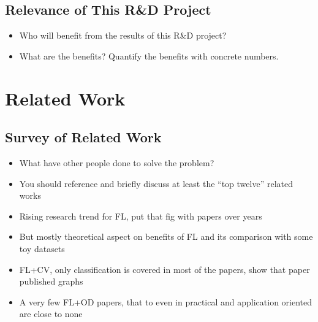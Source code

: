 \documentclass[thesis]{mas_proposal}
\begin{document}
\begin{itemize}

\end{itemize}

\subsection{Relevance of This R\&D Project}
\begin{itemize}

      \item Who will benefit from the results of this R\&D project?
      \item What are the benefits? Quantify the benefits with concrete numbers.
\end{itemize}

\section{Related Work}

\subsection{Survey of Related Work}
\begin{itemize}



      \item What have other people done to solve the problem?
      \item You should reference and briefly discuss at least the ``top twelve'' related works
      \item Rising research trend for FL, put that fig with papers over years
      \item But mostly theoretical aspect on benefits of FL and its comparison with some toy datasets 
      \item FL+CV, only classification is covered in most of the papers, show that paper published graphs
      \item A very few FL+OD papers, that to even in practical and application oriented are close to none
      
\end{itemize}
\end{document}
